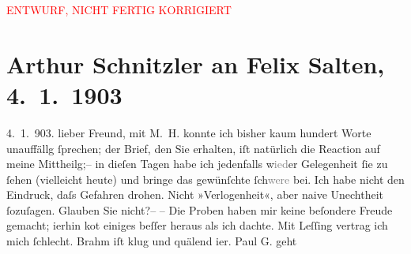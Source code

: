 
\begin{center}
            \textcolor{red}{ENTWURF, NICHT FERTIG KORRIGIERT}
                      \end{center}
            
         
         \renewcommand{\erwaehntePersonen}{Personen: Otto Brahm, Paul Goldmann, Mirjam Horwitz, Emil Lessing, Felix Salten, Olga Schnitzler}
         \renewcommand{\erwaehnteInstitutionen}{Institutionen: Die Zeit}
         \renewcommand{\erwaehnteOrte}{Orte: Berlin, Wien}
         \renewcommand{\erwaehnteWerke}{}
               \section[Arthur Schnitzler an Felix Salten, 4. 1. 1903]{ Arthur Schnitzler an Felix Salten, 4. 1. 1903}\nopagebreak{}\rehead{ }\begin{ledgroupsized}[t]{13cm}\normalsize\beginnumbering \toendnotes[C]{\smallbreak\pagebreak[2]} 
\toendnotes[C]{\smallbreak}\pstart
           \raggedleft{}{\pb}4. 1. 903. \pend
           \pstart
           lieber Freund, mit \textsc{M. H.} konnte ich bisher kaum hundert Worte unauffällg ſprechen; der Brief, den Sie
               erhalten, iſt natürlich die Reaction auf meine Mittheilg;– in dieſen Tagen habe ich
               jedenfalls w\textcolor{gray}{ied}er Gelegenheit ſie zu ſehen (vielleicht heute) und
               bringe das gewünſchte ſch\textcolor{gray}{were} bei. Ich habe nicht den Eindruck,
               daſs Gefahren drohen. Nicht »Verlogenheit«, aber naive Unechtheit ſozuſagen. Glauben
               Sie nicht?– {\pb}– Die Proben haben mir keine
               beſondere Freude gemacht; i{\geminationm}erhin ko{\geminationm}t einiges beſſer heraus als ich dachte. Mit Leſſing vertrag ich mich ſchlecht. Brahm iſt klug und quälend i{\geminationm}er. Paul G. geht

\end{ledgroupsized}
